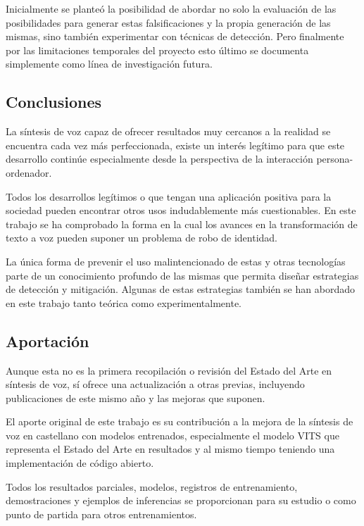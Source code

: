 Inicialmente se planteó la posibilidad de abordar no solo la evaluación de las posibilidades para generar estas falsificaciones y la propia generación de las mismas, sino también experimentar con técnicas de detección. Pero finalmente por las limitaciones temporales del proyecto esto último se documenta simplemente como línea de investigación futura.

\subsection{Conclusiones}

La síntesis de voz capaz de ofrecer resultados muy cercanos a la realidad se encuentra cada vez más perfeccionada, existe un interés legítimo para que este desarrollo continúe especialmente desde la perspectiva de la interacción persona-ordenador.

Todos los desarrollos legítimos o que tengan una aplicación positiva para la sociedad pueden encontrar otros usos indudablemente más cuestionables. En este trabajo se ha comprobado la forma en la cual los avances en la transformación de texto a voz pueden suponer un problema de robo de identidad.

La única forma de prevenir el uso malintencionado de estas y otras tecnologías parte de un conocimiento profundo de las mismas que permita diseñar estrategias de detección y mitigación. Algunas de estas estrategias también se han abordado en este trabajo tanto teórica como experimentalmente.

\subsection{Aportación}

Aunque esta no es la primera recopilación o revisión del Estado del Arte en síntesis de voz, sí ofrece una actualización a otras previas, incluyendo publicaciones de este mismo año y las mejoras que suponen.

El aporte original de este trabajo es su contribución a la mejora de la síntesis de voz en castellano con modelos entrenados, especialmente el modelo VITS que representa el Estado del Arte en resultados y al mismo tiempo teniendo una implementación de código abierto. 

Todos los resultados parciales, modelos, registros de entrenamiento, demostraciones y ejemplos de inferencias se proporcionan para su estudio o como punto de partida para otros entrenamientos.

\newpage 
